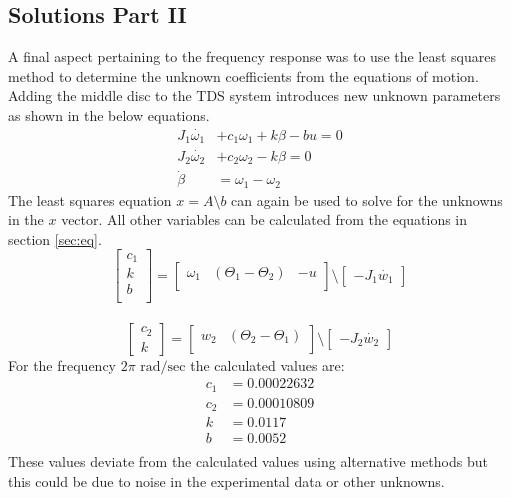 \documentclass[11pt,titlepage]{article}
\begin{document}
	\subsection{Solutions Part II}
		A final aspect pertaining to the frequency response was to use the least squares method to determine the unknown coefficients from the equations of motion. Adding the middle disc to the TDS system introduces new unknown parameters as shown in the below equations.
		\begin{align}
			J_1\dot{\omega_1} &+ c_1\omega_1 + k\beta - bu = 0 \\
			J_2\dot{\omega_2} &+ c_2\omega_2 -k\beta = 0 \\
			\dot{\beta} &= \omega_1 - \omega_2
		\end{align}
		The least squares equation $x =A \setminus b$ can again be used to solve for the unknowns in the $x$ vector. All other variables can be calculated from the equations in section \ref{sec:eq}.
		\begin{equation}
			\begin{bmatrix}
				c_1 \\
				k \\
				b \\
			\end{bmatrix}
			=
			\begin{bmatrix}
				\omega_1 & (\Theta_1 - \Theta_2) & -u \\
			\end{bmatrix}
			\setminus
			\begin{bmatrix}
				-J_1\dot{w_1}
			\end{bmatrix}
		\end{equation}\\
		\begin{equation}
			\begin{bmatrix}
				c_2 \\
				k
			\end{bmatrix}
			=
			\begin{bmatrix}
				w_2 & (\Theta_2 - \Theta_1) \\
			\end{bmatrix}
			\setminus
			\begin{bmatrix}
				-J_2\dot{w_2}
			\end{bmatrix}
		\end{equation}
		For the frequency $2\pi \mbox{ rad/sec}$ the calculated values are:
		\begin{align*}
			c_1 &= 0.00022632 \\
			c_2 &= 0.00010809 \\
			k &= 0.0117 \\
			b &= 0.0052 \\
		\end{align*}
		These values deviate from the calculated values using alternative methods but this could be due to noise in the experimental data or other unknowns.
\end{document}
